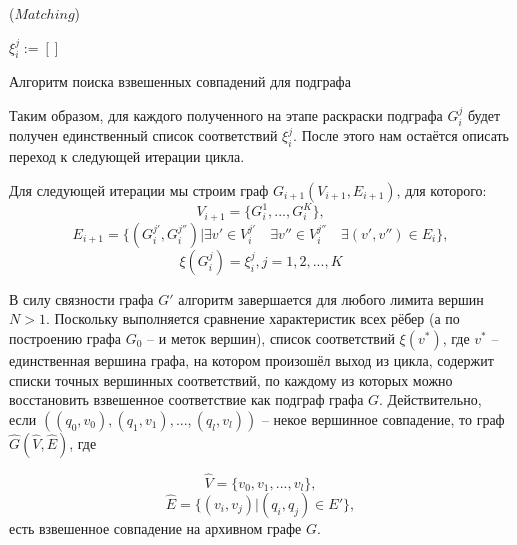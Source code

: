 \begin{algorithm}[H]
	\Large
	\Begin($Matching$){
		
		$\xi_i^j := []$
		
		
	}
	
	\caption{Алгоритм поиска взвешенных совпадений для подграфа}
	\label{alg:findall}
\end{algorithm}

Таким образом, для каждого полученного на этапе раскраски подграфа $G_i^j$ будет получен единственный список соответствий $\xi_i^j$. После этого нам остаётся описать переход к следующей итерации цикла.

Для следующей итерации мы строим граф $G_{i+1}(V_{i+1}, E_{i+1})$, для которого:
\[V_{i+1} = \{G_i^1, ..., G_i^K\}, \]
\[E_{i+1} = \{(G_i^{j'}, G_i^{j''}) | \exists v' \in V_i^{j'} \quad \exists v'' \in V_i^{j''} \quad \exists (v', v'') \in E_i \}, \]
\[\xi(G_i^j) = \xi_i^j, j = 1, 2, ..., K\]

В силу связности графа $G'$ алгоритм завершается для любого лимита вершин $N > 1$. Поскольку выполняется сравнение характеристик всех рёбер (а по построению графа $G_0$ -- и меток вершин), список соответствий $\xi(v^{*})$, где $v^{*}$ -- единственная вершина графа, на котором произошёл выход из цикла, содержит списки точных вершинных соответствий, по каждому из которых можно восстановить взвешенное соответствие как подграф графа $G$. Действительно, если $((q_0, v_0), (q_1, v_1), ..., (q_l, v_l))$ -- некое вершинное совпадение, то граф $\widehat{G}(\widehat{V}, \widehat{E})$, где

\[\widehat{V} = \{v_0, v_1, ..., v_l\},\]
\[\widehat{E} = \{(v_i, v_j) | (q_i, q_j) \in E'\},\]
есть взвешенное совпадение на архивном графе $G$.